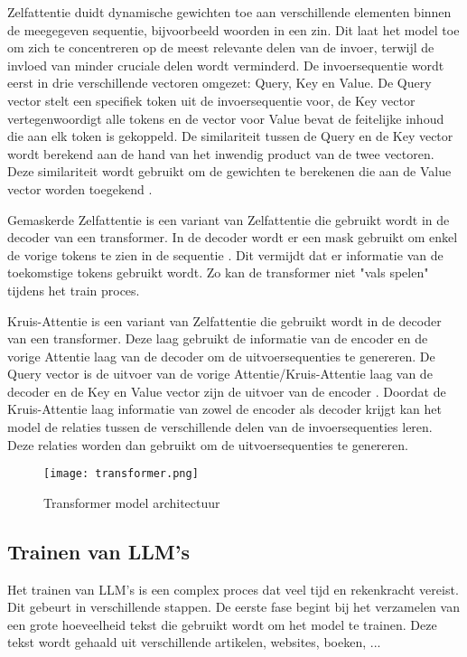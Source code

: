 Zelfattentie duidt dynamische gewichten toe aan verschillende elementen binnen de meegegeven sequentie, bijvoorbeeld woorden in een zin.
Dit laat het model toe om zich te concentreren op de meest relevante delen van de invoer, terwijl de invloed van minder cruciale delen wordt verminderd.
De invoersequentie wordt eerst in drie verschillende vectoren omgezet: Query, Key en Value.
De Query vector stelt een specifiek token uit de invoersequentie voor, de Key vector vertegenwoordigt alle tokens en de vector voor Value bevat de feitelijke inhoud die aan elk token is gekoppeld.
De similariteit tussen de Query en de Key vector wordt berekend aan de hand van het inwendig product van de twee vectoren.
Deze similariteit wordt gebruikt om de gewichten te berekenen die aan de Value vector worden toegekend \autocite{VaswaniEtAl2017}.

Gemaskerde Zelfattentie is een variant van Zelfattentie die gebruikt wordt in de decoder van een transformer.
In de decoder wordt er een mask gebruikt om enkel de vorige tokens te zien in de sequentie \autocite{VaswaniEtAl2017}.
Dit vermijdt dat er informatie van de toekomstige tokens gebruikt wordt. 
Zo kan de transformer niet "vals spelen" tijdens het train proces.

Kruis-Attentie is een variant van Zelfattentie die gebruikt wordt in de decoder van een transformer.
Deze laag gebruikt de informatie van de encoder en de vorige Attentie laag van de decoder om de uitvoersequenties te genereren.
De Query vector is de uitvoer van de vorige Attentie/Kruis-Attentie laag van de decoder en de Key en Value vector zijn de uitvoer van de encoder \autocite{VaswaniEtAl2017}.
Doordat de Kruis-Attentie laag informatie van zowel de encoder als decoder krijgt kan het model de relaties tussen de verschillende delen van de invoersequenties leren.
Deze relaties worden dan gebruikt om de uitvoersequenties te genereren.

\begin{figure}[h]
  \centering
  \texttt{[image: transformer.png]}
  \caption[Architectuur transformer model]{Transformer model architectuur \autocite{VaswaniEtAl2017}}
  \label{fig:transformer-model}
\end{figure}

\subsection{Trainen van LLM's}
\label{sec:trainen-van-llms}
Het trainen van LLM's is een complex proces dat veel tijd en rekenkracht vereist. Dit gebeurt in verschillende stappen.
De eerste fase begint bij het verzamelen van een grote hoeveelheid tekst die gebruikt wordt om het model te trainen.
Deze tekst wordt gehaald uit verschillende artikelen, websites, boeken, ... 

